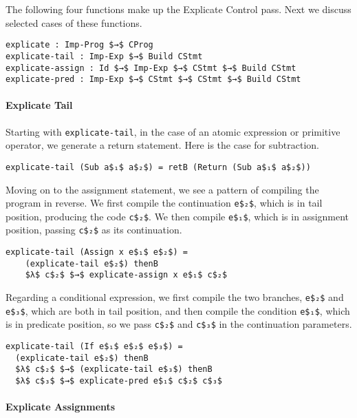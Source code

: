 \documentclass[sigplan,screen]{acmart}
\begin{document}
\noindent The following four functions make up the Explicate Control
pass. Next we discuss selected cases of these functions.

\begin{lstlisting}[basicstyle=\ttfamily\footnotesize]
explicate : Imp-Prog $→$ CProg
explicate-tail : Imp-Exp $→$ Build CStmt
explicate-assign : Id $→$ Imp-Exp $→$ CStmt $→$ Build CStmt
explicate-pred : Imp-Exp $→$ CStmt $→$ CStmt $→$ Build CStmt
\end{lstlisting}

\paragraph{Explicate Tail}

Starting with \lstinline{explicate-tail}, in the case of an atomic
expression or primitive operator, we generate a return statement.
Here is the case for subtraction.

\begin{lstlisting}
explicate-tail (Sub a$₁$ a$₂$) = retB (Return (Sub a$₁$ a$₂$))
\end{lstlisting}

\noindent Moving on to the assignment statement, we see a pattern of
compiling the program in reverse. We first compile the continuation
\lstinline{e$₂$}, which is in tail position, producing the code \lstinline{c$₂$}.
We then compile \lstinline{e$₁$}, which is in assignment position,
passing \lstinline{c$₂$} as its continuation.

\begin{lstlisting}
explicate-tail (Assign x e$₁$ e$₂$) =
    (explicate-tail e$₂$) thenB
    $λ$ c$₂$ $→$ explicate-assign x e$₁$ c$₂$
\end{lstlisting}

\noindent Regarding a conditional expression, we first compile the two
branches, \lstinline{e$₂$} and \lstinline{e$₃$}, which are both in tail
position, and then compile the condition \lstinline{e$₁$}, which is in
predicate position, so we pass \lstinline{c$₂$} and \lstinline{c$₃$} in
the continuation parameters.

\begin{lstlisting}
explicate-tail (If e$₁$ e$₂$ e$₃$) =
  (explicate-tail e$₂$) thenB
  $λ$ c$₂$ $→$ (explicate-tail e$₃$) thenB
  $λ$ c$₃$ $→$ explicate-pred e$₁$ c$₂$ c$₃$
\end{lstlisting}

\paragraph{Explicate Assignments}
\end{document}
